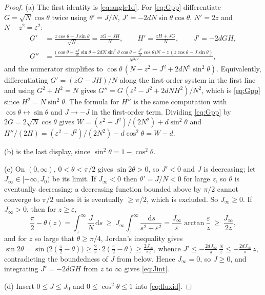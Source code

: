 \documentclass[11pt,a4paper]{article}
\theoremstyle{plain}
\theoremstyle{definition}
\theoremstyle{remark}
\newcommand{\dd}{\,\mathrm{d}}
\begin{document}
\begin{proof}
(a) The first identity is \eqref{eq:angle1d}. For \eqref{eq:Gpp} differentiate $G=\sqrt N\cos\theta$ twice using $\theta'=J/N$, $J'=-2dN\sin\theta\cos\theta$, $N'=2z$ and $N-z^2=\varepsilon^2$:
\[
\begin{aligned}
G'&=\frac{z\cos\theta-J\sin\theta}{\sqrt N}=\frac{zG-JH}{N},\qquad H'=\frac{zH+JG}{N},\qquad J'=-2dGH,\\
G''&=\frac{\big(\cos\theta-\tfrac{zJ}{N}\sin\theta+2dN\sin^2\theta\cos\theta-\tfrac{J^2}{N}\cos\theta\big)N-z\,(z\cos\theta-J\sin\theta)}{N^{3/2}},
\end{aligned}
\]
and the numerator simplifies to $\cos\theta\,(N-z^2-J^2+2dN^2\sin^2\theta)$. Equivalently, differentiating $G'=(zG-JH)/N$ along the first-order system in the first line and using $G^2+H^2=N$ gives $G''=G\,(\varepsilon^2-J^2+2dNH^2)/N^2$, which is \eqref{eq:Gpp} since $H^2=N\sin^2\theta$. The formula for $H''$ is the same computation with $\cos\theta\leftrightarrow\sin\theta$ and $J\to-J$ in the first-order term. Dividing \eqref{eq:Gpp} by $2G=2\sqrt N\cos\theta$ gives $W=(\varepsilon^2-J^2)/(2N^2)+d\sin^2\theta$ and $H''/(2H)=(\varepsilon^2-J^2)/(2N^2)-d\cos^2\theta=W-d$.

(b) is the last display, since $\sin^2\theta=1-\cos^2\theta$.

(c) On $(0,\infty)$, $0<\theta<\pi/2$ gives $\sin2\theta>0$, so $J'<0$ and $J$ is decreasing; let $J_\infty\in[-\infty,J_0)$ be its limit. If $J_\infty<0$ then $\theta'=J/N<0$ for large $z$, so $\theta$ is eventually decreasing; a decreasing function bounded above by $\pi/2$ cannot converge to $\pi/2$ unless it is eventually $\ge\pi/2$, which is excluded. So $J_\infty\ge0$. If $J_\infty>0$, then for $z\ge\varepsilon$,
\[
\frac\pi2-\theta(z)=\int_z^\infty\frac{J}{N}\dd s\ \ge\ J_\infty\int_z^\infty\frac{\dd s}{s^2+\varepsilon^2}=\frac{J_\infty}{\varepsilon}\arctan\frac\varepsilon z\ \ge\ \frac{J_\infty}{2z},
\]
and for $z$ so large that $\theta\ge\pi/4$, Jordan's inequality gives $\sin2\theta=\sin\big(2(\tfrac\pi2-\theta)\big)\ge\tfrac2\pi\cdot2(\tfrac\pi2-\theta)\ge\tfrac{2J_\infty}{\pi z}$, whence $J'\le-\tfrac{2dJ_\infty}{\pi}\,\tfrac{N}{z}\le-\tfrac{2dJ_\infty}{\pi}\,z$, contradicting the boundedness of $J$ from below. Hence $J_\infty=0$, so $J\ge0$, and integrating $J'=-2dGH$ from $z$ to $\infty$ gives \eqref{eq:Jint}.

(d) Insert $0\le J\le J_0$ and $0\le\cos^2\theta\le1$ into \eqref{eq:fluxid}.
\end{proof}
\end{document}
